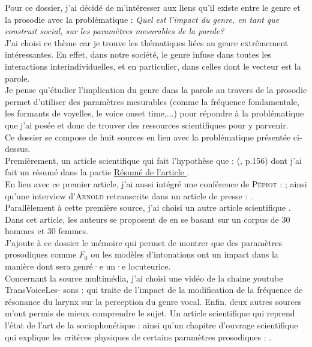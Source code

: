 Pour ce dossier, j'ai décidé de m'intéresser aux liens qu'il existe entre le genre et la prosodie avec la problématique : \textit{Quel est l'impact du genre, en tant que construit social, sur les paramètres mesurables de la parole?} \\
J'ai choisi ce thème car je trouve les thématiques liées au genre extrêmement intéressantes.
En effet, dans notre société, le genre infuse dans toutes les interactions interindividuelles, et en particulier, dans celles dont le vecteur est la parole. \\
Je pense qu'étudier l'implication du genre dans la parole au travers de la prosodie permet d'utiliser des paramètres mesurables (comme la fréquence fondamentale, les formants de voyelles, le voice onset time,...) pour répondre à la problématique que j'ai posée et donc de trouver des ressources scientifiques pour y parvenir.\\

Ce dossier se compose de huit sources en lien avec la problématique présentée ci-dessus.\\
Premièrement, un article scientifique qui fait l'hypothèse que  : (\cite{Pep20}, p.156) dont j'ai fait un résumé dans la partie \hyperref[sec:resume]{Résumé de l'article \parencite{Pep20}}.\\
En lien avec ce premier article, j'ai aussi intégré une conférence de \textsc{Pépiot} : \parencite{Pep16}; ainsi qu'une interview d'\textsc{Arnold} retranscrite dans un article de presse : \parencite{Bro18}.\\
Parallèlement à cette première source, j'ai choisi un autre article scientifique \parencite{Boe75}. Dans cet article, les auteurs se proposent de  en se basant sur un corpus de 30 hommes et 30 femmes.\\
J'ajoute à ce dossier le mémoire \parencite{Gar22} qui permet de montrer que des paramètres prosodiques comme $F_0$ ou les modèles d'intonations ont un impact dans la manière dont sera genré·e un·e locuteurice.\\
Concernant la source multimédia, j'ai choisi une vidéo de la chaine youtube TransVoiceLes- sons : \parencite{video} qui traite de l'impact de la modification de la fréquence de résonance du larynx sur la perception du genre vocal.
Enfin, deux autres sources m'ont permis de mieux comprendre le sujet. Un article scientifique qui reprend l'état de l'art de la sociophonétique : \parencite{Can15} ainsi qu'un chapitre d'ouvrage scientifique qui explique les critères physiques de certains paramètres prosodiques : \parencite{DiC13}.


